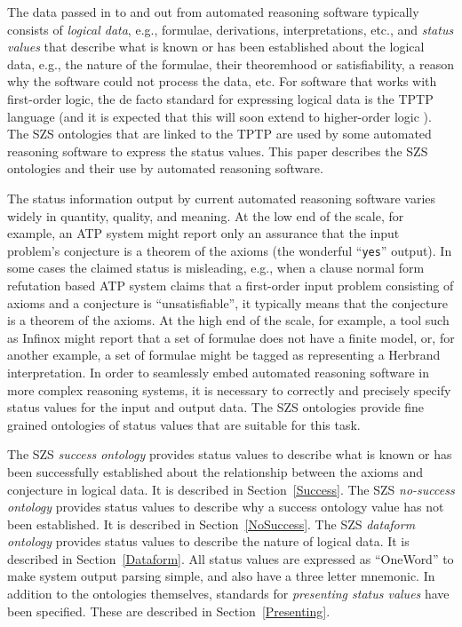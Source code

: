 \documentclass[a4paper]{easychair}
\begin{document}
The data passed in to and out from automated reasoning software typically
consists of {\em logical data}, e.g., formulae, derivations, interpretations,
etc., and {\em status values} that describe what is known or has been
established about the logical data, e.g., the nature of the formulae, their
theoremhood or satisfiability, a reason why the software could not process
the data, etc.
For software that works with first-order logic, the de facto standard for
expressing logical data is the TPTP language \cite{SS+06} (and it is 
expected that this will soon extend to higher-order logic \cite{BRS08}).
The SZS ontologies that are linked to the TPTP are used by some automated
reasoning software to express the status values.
This paper describes the SZS ontologies and their use by automated reasoning
software.

The status information output by current automated reasoning software varies
widely in quantity, quality, and meaning.
At the low end of the scale, for example, an ATP system might report only
an assurance that the input problem's conjecture is a theorem of the axioms
(the wonderful ``{\tt yes}'' output).
In some cases the claimed status is misleading, e.g., when a clause normal form
refutation based ATP system claims that a first-order input problem consisting
of axioms and a conjecture is ``unsatisfiable'', it typically means that
the conjecture is a theorem of the axioms.
At the high end of the scale, for example, a tool such as Infinox might
report that a set of formulae does not have a finite model, or, for another
example, a set of formulae might be tagged as representing a Herbrand
interpretation.
In order to seamlessly embed automated reasoning software in more complex
reasoning systems, it is necessary to correctly and precisely specify status
values for the input and output data.
The SZS ontologies provide fine grained ontologies of status values
that are suitable for this task.

The SZS {\em success ontology} provides status values to describe what is 
known or has been successfully established about the relationship between 
the axioms and conjecture in logical data.
It is described in Section~\ref{Success}.
The SZS {\em no-success ontology} provides status values to describe why a
success ontology value has not been established.
It is described in Section~\ref{NoSuccess}.
The SZS {\em dataform ontology} provides status values to describe the nature
of logical data.
It is described in Section~\ref{Dataform}.
All status values are expressed as ``OneWord'' to make system output parsing
simple, and also have a three letter mnemonic.
In addition to the ontologies themselves, standards for {\em presenting
status values} have been specified.
These are described in Section~\ref{Presenting}.
\end{document}
